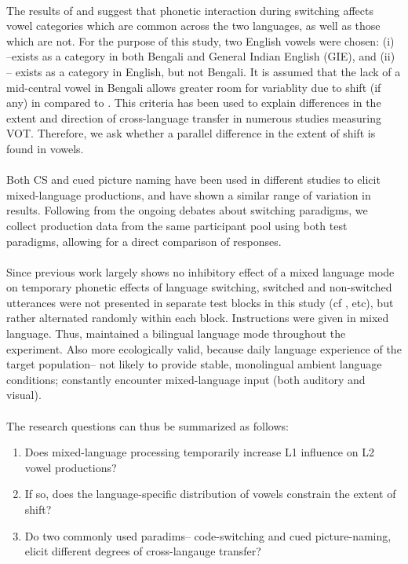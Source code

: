 \documentclass[11pt]{article}
\newcommand{\nt}[1]{\textipa{[#1]}} %
\newcommand{\wt}[1]{\textipa{/#1/}} %
\begin{document}
\paragraph{}The results of  and  suggest that phonetic interaction during switching affects vowel categories which are common across the two languages, as well as those which are not. For the purpose of this study, two English vowels were chosen:
(i) \wt{\ae}--exists as a category in both Bengali and General Indian English (GIE)\cite{masica1972sound}, and (ii) \wt{2}-- exists as a category in English, but not Bengali. It is assumed that the lack of a mid-central vowel in Bengali allows greater room for variablity due to shift (if any) in \nt{2} compared to \nt{\ae}. This criteria has been used to explain differences in the extent and direction of cross-language transfer in numerous studies measuring VOT. Therefore, we ask whether a parallel difference in the extent of shift is found in vowels. 


\paragraph{}Both CS and cued picture naming have been used in different studies to elicit mixed-language productions, and have shown a similar range of variation in results. Following from the ongoing debates about  switching paradigms, we collect production data from the same participant pool using both test paradigms, allowing for a direct comparison of responses. 

\paragraph{}Since previous work largely shows no inhibitory effect of a mixed language mode on temporary phonetic effects of language switching, switched and non-switched utterances were not presented in separate test blocks in this study (cf , etc), but rather alternated randomly within each block. Instructions were given in mixed language. Thus, maintained a bilingual language mode throughout the experiment. Also more ecologically valid, because daily language experience of the target population-- not likely to provide stable, monolingual ambient language conditions; constantly encounter mixed-language input (both auditory and visual).

\paragraph{}The research questions can thus be summarized as follows:
\begin{enumerate}[label=(\roman*)]
	\item Does mixed-language processing temporarily increase L1 influence on L2 vowel productions?
	\item If so, does the language-specific distribution of vowels constrain the extent of shift?
	\item Do two commonly used paradims-- code-switching and cued picture-naming, elicit different degrees of cross-langauge transfer?
\end{enumerate}
\end{document}

